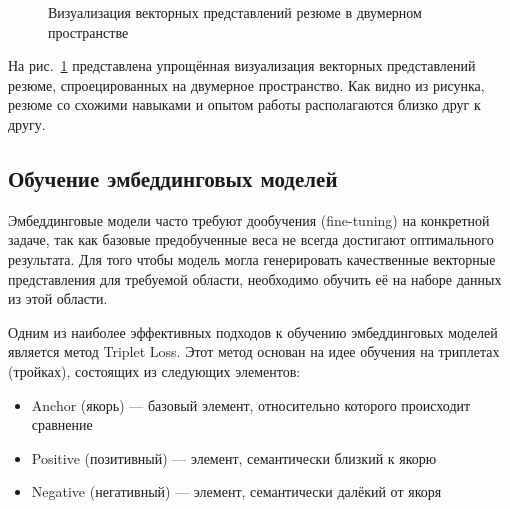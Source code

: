 \documentclass[14pt]{mmcs_article}
\begin{document}
\begin{figure}[h]
  \centering
  \caption{\centering Визуализация векторных представлений резюме в двумерном пространстве}
  \label{fig:embedding_visualization}
\end{figure}

На рис.~\ref{fig:embedding_visualization} представлена упрощённая визуализация векторных представлений резюме, спроецированных на двумерное пространство. Как видно из рисунка, резюме со схожими навыками и опытом работы располагаются близко друг к другу.

\subsection{Обучение эмбеддинговых моделей}

Эмбеддинговые модели часто требуют дообучения (fine-tuning) на конкретной задаче, так как базовые предобученные веса не всегда достигают оптимального результата. Для того чтобы модель могла генерировать качественные векторные представления для требуемой области, необходимо обучить её на наборе данных из этой области.

Одним из наиболее эффективных подходов к обучению эмбеддинговых моделей является метод Triplet Loss. Этот метод основан на идее обучения на триплетах (тройках), состоящих из следующих элементов:
\begin{itemize}
  \item Anchor (якорь) --- базовый элемент, относительно которого происходит сравнение
  \item Positive (позитивный) --- элемент, семантически близкий к якорю
  \item Negative (негативный) --- элемент, семантически далёкий от якоря
\end{itemize}
\end{document}
